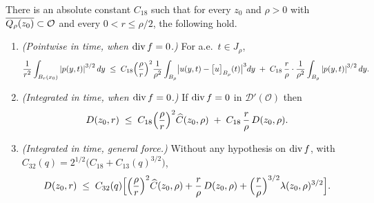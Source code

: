 \documentclass[11pt,reqno]{amsart}
\begin{document}
\begin{proposition}
\label{prop:lin34}
There is an absolute constant $C_{18}$ such that for every
$z_{0}$ and $\rho>0$ with $\overline{Q_{\rho}(z_{0})}\subset\mathcal{O}$ and every
$0<r\le\rho/2$, the following hold.
\begin{enumerate}
\item[(i)] \emph{(Pointwise in time, when $\operatorname{div} f=0$.)} For a.e.\ $t\in J_{\rho}$,
\begin{equation}\label{eq:lin34-pointwise}
  \frac1{r^{2}}\int_{B_{r}(x_{0})}\left\lvert p(y,t) \right\rvert^{3/2}dy
  \;\le\;C_{18}\Bigl(\frac\rho r\Bigr)^{2}\frac1{\rho^{2}}
     \int_{B_{\rho}}\bigl|u(y,t)-\bigl[u\bigr]_{B_{\rho}}(t)\bigr|^{3}dy
   \;+\;C_{18}\,\frac r\rho\cdot\frac1{\rho^{2}}
     \int_{B_{\rho}}\left\lvert p(y,t) \right\rvert^{3/2}dy .
\end{equation}
\item[(ii-a)] \emph{(Integrated in time, when $\operatorname{div} f=0$.)} If $\operatorname{div} f=0$ in
$\mathcal{D}'(\mathcal{O})$ then
\begin{equation}\label{eq:lin35}
  D(z_{0},r)\;\le\;C_{18}\Bigl(\frac\rho r\Bigr)^{2}\widehat C(z_{0},\rho)
   \;+\;C_{18}\,\frac r\rho\,D(z_{0},\rho).
\end{equation}
\item[(ii-b)] \emph{(Integrated in time, general force.)} Without any hypothesis
on $\operatorname{div} f$, with $C_{32}(q)=2^{1/2}\bigl(C_{18}+C_{13}(q)^{3/2}\bigr)$,
\begin{equation}\label{eq:lin35-force}
  D(z_{0},r)\;\le\;C_{32}(q)\Bigl[\Bigl(\frac\rho r\Bigr)^{2}\widehat C(z_{0},\rho)
   +\frac r\rho\,D(z_{0},\rho)
   +\Bigl(\frac r\rho\Bigr)^{3/2}\lambda(z_{0},\rho)^{3/2}\Bigr].
\end{equation}
\end{enumerate}
\end{proposition}
\end{document}
